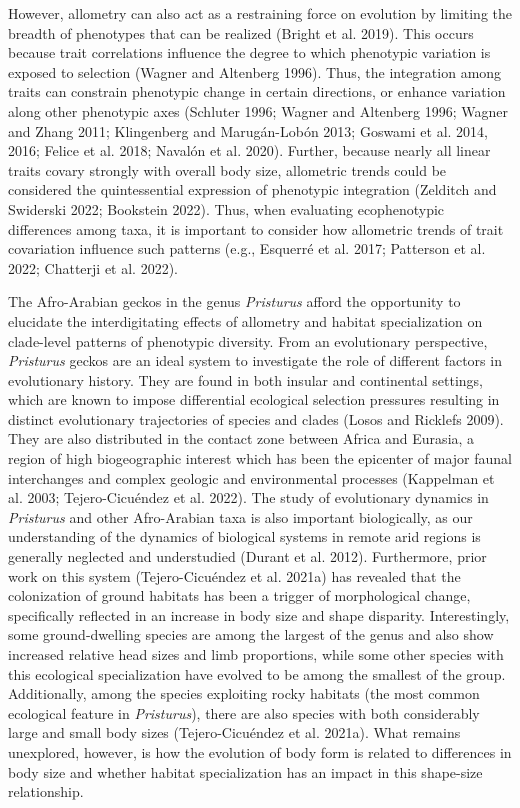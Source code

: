 \documentclass[
  11pt,
]{article}
\begin{document}
However, allometry can also act as a restraining force on evolution by
limiting the breadth of phenotypes that can be realized (Bright et al.
2019). This occurs because trait correlations influence the degree to
which phenotypic variation is exposed to selection (Wagner and Altenberg
1996). Thus, the integration among traits can constrain phenotypic
change in certain directions, or enhance variation along other
phenotypic axes (Schluter 1996; Wagner and Altenberg 1996; Wagner and
Zhang 2011; Klingenberg and Marugán-Lobón 2013; Goswami et al. 2014,
2016; Felice et al. 2018; Navalón et al. 2020). Further, because nearly
all linear traits covary strongly with overall body size, allometric
trends could be considered the quintessential expression of phenotypic
integration (Zelditch and Swiderski 2022; Bookstein 2022). Thus, when
evaluating ecophenotypic differences among taxa, it is important to
consider how allometric trends of trait covariation influence such
patterns (e.g., Esquerré et al. 2017; Patterson et al. 2022; Chatterji
et al. 2022). \hfill\break

The Afro-Arabian geckos in the genus \emph{Pristurus} afford the
opportunity to elucidate the interdigitating effects of allometry and
habitat specialization on clade-level patterns of phenotypic diversity.
From an evolutionary perspective, \emph{Pristurus} geckos are an ideal
system to investigate the role of different factors in evolutionary
history. They are found in both insular and continental settings, which
are known to impose differential ecological selection pressures
resulting in distinct evolutionary trajectories of species and clades
(Losos and Ricklefs 2009). They are also distributed in the contact zone
between Africa and Eurasia, a region of high biogeographic interest
which has been the epicenter of major faunal interchanges and complex
geologic and environmental processes (Kappelman et al. 2003;
Tejero-Cicuéndez et al. 2022). The study of evolutionary dynamics in
\emph{Pristurus} and other Afro-Arabian taxa is also important
biologically, as our understanding of the dynamics of biological systems
in remote arid regions is generally neglected and understudied (Durant
et al. 2012). Furthermore, prior work on this system (Tejero-Cicuéndez
et al. 2021a) has revealed that the colonization of ground habitats has
been a trigger of morphological change, specifically reflected in an
increase in body size and shape disparity. Interestingly, some
ground-dwelling species are among the largest of the genus and also show
increased relative head sizes and limb proportions, while some other
species with this ecological specialization have evolved to be among the
smallest of the group. Additionally, among the species exploiting rocky
habitats (the most common ecological feature in \emph{Pristurus}), there
are also species with both considerably large and small body sizes
(Tejero-Cicuéndez et al. 2021a). What remains unexplored, however, is
how the evolution of body form is related to differences in body size
and whether habitat specialization has an impact in this shape-size
relationship. \hfill\break
\end{document}
